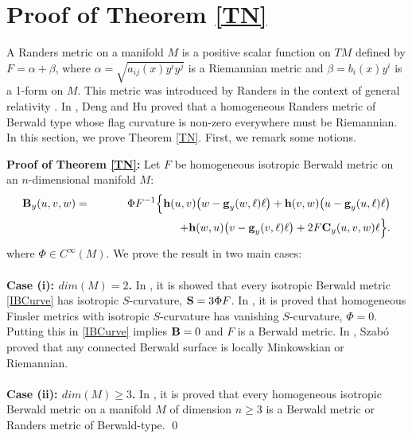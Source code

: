 \documentclass[12pt,a4paper]{article}
\theoremstyle{definition}
\numberwithin{equation}{section}
\begin{document}
\section{Proof of Theorem \ref{TN}}
A Randers metric  on a manifold $M$ is a positive scalar function on $TM$ defined by $F=\alpha +\beta$,  where   $\alpha=\sqrt{a_{ij}(x)y^iy^j}$ is a Riemannian metric and $\beta =b_i(x)y^i$ is a 1-form on  $M$.  This metric was introduced by Randers in the context of general relativity \cite{ShDiff}. In \cite{DH}, Deng and Hu proved that a homogeneous Randers metric of Berwald type whose flag curvature is  non-zero everywhere must be Riemannian. In this section, we prove Theorem \ref{TN}. First, we remark some notions.


\bigskip
\noindent
{\bf Proof of Theorem \ref{TN}:} Let $F$ be homogeneous  isotropic Berwald   metric on an $n$-dimensional manifold $M$:
\begin{eqnarray}\label{IBCurve}
\nonumber{\bf B}_y(u,v,w)&=& \Phi F^{-1}\Big\{{\bf h}(u,v)\big (w-\textbf{g}_y(w,\ell)\ell\big)+{\bf h}(v, w)\big(u-\textbf{g}_y(u,\ell)\ell\big)
\\ &&\quad\quad \ \ \ \ \ \ \ \ \  \ \ \ \ \ \ \ +{\bf h}(w, u)\big(v-\textbf{g}_y(v,\ell)\ell\big)+2F{\bf C}_y(u, v, w) \ell\Big\}.
\end{eqnarray}
where $\Phi\in C^{\infty}(M)$.  We prove the result in two main cases:\\\\
{\bf Case (i): $dim(M)=2$.} In \cite{TR}, it is showed that every isotropic Berwald   metric \eqref{IBCurve} has isotropic $S$-curvature, ${\bf S}=3\Phi F$. In \cite{XD}, it is proved that homogeneous Finsler metrics with isotropic $S$-curvature has vanishing $S$-curvature, $\Phi=0$. Putting this in \eqref{IBCurve} implies ${\bf B}=0$ and $F$ is a Berwald metric. In \cite{Szabo1}, Szab\'{o} proved that any connected Berwald surface  is  locally Minkowskian or Riemannian.\\\\
{\bf Case (ii): $dim(M)\geq 3$.} In \cite{TN2},  it is proved that every homogeneous  isotropic Berwald   metric on a manifold $M$ of dimension $n\geq 3$ is a  Berwald metric or Randers metric of Berwald-type.
\qed
\end{document}
